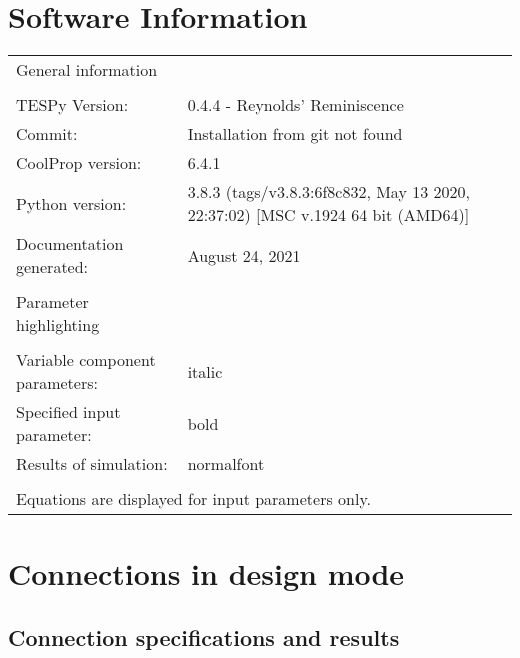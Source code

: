 \documentclass[]{article}
\newcommand{\iftab}{\fontshape{sl}\selectfont}
\newcommand{\bftab}{\fontseries{b}\selectfont}
\begin{document}
\section*{Software Information}

\begin{table}[H]
\begin{tabular}{ll}
\bftab General information&\\
& \\
TESPy Version:&0.4.4 - Reynolds' Reminiscence\\
Commit:&Installation from git not found\\
CoolProp version:&6.4.1\\
Python version:&3.8.3 (tags/v3.8.3:6f8c832, May 13 2020, 22:37:02) [MSC v.1924 64 bit (AMD64)]\\
Documentation generated:&August 24, 2021\\
& \\
\bftab Parameter highlighting&\\
& \\
Variable component parameters:& \iftab italic\\
Specified input parameter:& \bftab bold\\
Results of simulation:& normalfont \\
& \\
\multicolumn{2}{l}{\iftab Equations are displayed for input parameters only.}\\
\end{tabular}
\end{table}
\newpage\section{Connections in design mode}

\subsection{Connection specifications and results}
\end{document}
